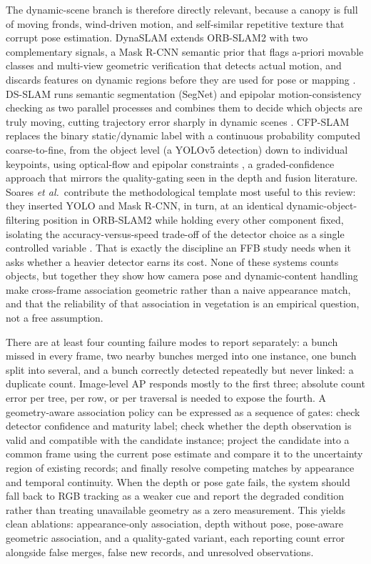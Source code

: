 The dynamic-scene branch is therefore directly relevant, because a canopy is full of moving fronds, wind-driven motion, and self-similar repetitive texture that corrupt pose estimation. DynaSLAM extends ORB-SLAM2 with two complementary signals, a Mask R-CNN semantic prior that flags a-priori movable classes and multi-view geometric verification that detects actual motion, and discards features on dynamic regions before they are used for pose or mapping \cite{bescos2018dynaslam}. DS-SLAM runs semantic segmentation (SegNet) and epipolar motion-consistency checking as two parallel processes and combines them to decide which objects are truly moving, cutting trajectory error sharply in dynamic scenes \cite{yu2018dsslam}. CFP-SLAM replaces the binary static/dynamic label with a continuous probability computed coarse-to-fine, from the object level (a YOLOv5 detection) down to individual keypoints, using optical-flow and epipolar constraints \cite{hu2022cfpslam}, a graded-confidence approach that mirrors the quality-gating seen in the depth and fusion literature. Soares \textit{et al.}\ contribute the methodological template most useful to this review: they inserted YOLO and Mask R-CNN, in turn, at an identical dynamic-object-filtering position in ORB-SLAM2 while holding every other component fixed, isolating the accuracy-versus-speed trade-off of the detector choice as a single controlled variable \cite{soares2019visualslam}. That is exactly the discipline an FFB study needs when it asks whether a heavier detector earns its cost. None of these systems counts objects, but together they show how camera pose and dynamic-content handling make cross-frame association geometric rather than a naive appearance match, and that the reliability of that association in vegetation is an empirical question, not a free assumption.

There are at least four counting failure modes to report separately: a bunch missed in every frame, two nearby bunches merged into one instance, one bunch split into several, and a bunch correctly detected repeatedly but never linked: a duplicate count. Image-level AP responds mostly to the first three; absolute count error per tree, per row, or per traversal is needed to expose the fourth. A geometry-aware association policy can be expressed as a sequence of gates: check detector confidence and maturity label; check whether the depth observation is valid and compatible with the candidate instance; project the candidate into a common frame using the current pose estimate and compare it to the uncertainty region of existing records; and finally resolve competing matches by appearance and temporal continuity. When the depth or pose gate fails, the system should fall back to RGB tracking as a weaker cue and report the degraded condition rather than treating unavailable geometry as a zero measurement. This yields clean ablations: appearance-only association, depth without pose, pose-aware geometric association, and a quality-gated variant, each reporting count error alongside false merges, false new records, and unresolved observations.

